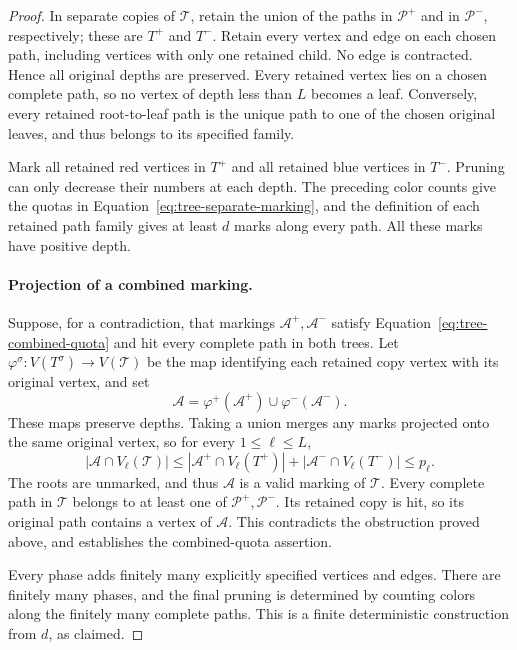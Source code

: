 \begin{proof}
In separate copies of $\mathcal T$, retain the union of the paths in
$\mathcal P^+$ and in $\mathcal P^-$, respectively; these are $T^+$ and
$T^-$.  Retain every vertex and edge on each chosen path, including
vertices with only one retained child.  No edge is contracted.  Hence
all original depths are preserved.  Every retained vertex lies on a
chosen complete path, so no vertex of depth less than $L$ becomes a leaf.
Conversely, every retained root-to-leaf path is the unique path to one
of the chosen original leaves, and thus belongs to its specified family.

Mark all retained red vertices in $T^+$ and all retained blue vertices
in $T^-$.  Pruning can only decrease their numbers at each depth.
The preceding color counts give the quotas in
Equation~\eqref{eq:tree-separate-marking}, and the definition of each
retained path family gives at least $d$ marks along every path.  All these
marks have positive depth.

\paragraph{Projection of a combined marking.}
Suppose, for a contradiction, that markings $\mathcal A^+,\mathcal A^-$
satisfy Equation~\eqref{eq:tree-combined-quota} and hit every complete path
in both trees.  Let $\varphi^\sigma:V(T^\sigma)\to V(\mathcal T)$ be the
map identifying each retained copy vertex with its original vertex, and
set
\begin{equation}\label{eq:tree-projected-marking}
 \mathcal A=
 \varphi^+(\mathcal A^+)\cup\varphi^-(\mathcal A^-).
\end{equation}
These maps preserve depths.  Taking a union merges any marks projected
onto the same original vertex, so for every $1\le\ell\le L$,
\[
 |\mathcal A\cap V_\ell(\mathcal T)|
 \le |\mathcal A^+\cap V_\ell(T^+)|
     +|\mathcal A^-\cap V_\ell(T^-)|
 \le p_\ell.
\]
The roots are unmarked, and thus $\mathcal A$ is a valid marking of
$\mathcal T$.  Every complete path in $\mathcal T$ belongs to at least
one of $\mathcal P^+,\mathcal P^-$.  Its retained copy is hit, so its
original path contains a vertex of $\mathcal A$.  This contradicts the
obstruction proved above, and establishes the combined-quota assertion.

Every phase adds finitely many explicitly specified vertices and edges.
There are finitely many phases, and the final pruning is determined by
counting colors along the finitely many complete paths.  This is a finite
deterministic construction from $d$, as claimed.
\end{proof}
